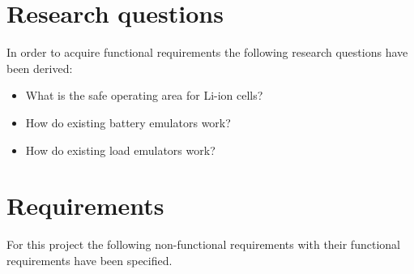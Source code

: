 \section{Research questions}
In order to acquire functional requirements the following research questions have been derived:
\begin{itemize}
    \item What is the safe operating area for Li-ion cells?
    \item How do existing battery emulators work?
    \item How do existing load emulators work?
\end{itemize}

\section{Requirements}
For this project the following non-functional requirements with their functional requirements have been specified.

